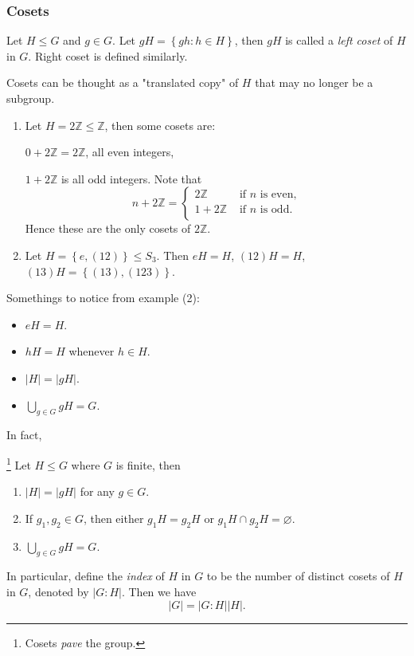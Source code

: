\documentclass[a4paper]{article}
\begin{document}
    \subsubsection{Cosets}
    \begin{definition}
        Let $H\le G$ and $g\in G$. Let $ gH=\left\{ gh:h\in H\right\} $, then $gH$ is called a \textit{left coset} of $H$ in $G$. Right coset is defined similarly.
    \end{definition}
    Cosets can be thought as a "translated copy" of $H$ that may no longer be a subgroup.
    \begin{example}
        \begin{enumerate}[(1)]
            \item Let $ H=2 \mathbb{Z} \le \mathbb{Z} $, then some cosets are: 

            $0+2\mathbb{Z}=2 \mathbb{Z}$, all even integers,

            $ 1+2 \mathbb{Z} $ is all odd integers. Note that 
            \[
                n+  2 \mathbb{Z} =\begin{cases}
                2\mathbb{Z} &\text{ if $n$ is even,}\\
                1+2\mathbb{Z} &\text{ if $n$ is odd.}\\
                \end{cases} 
            \]
            Hence these are the only cosets of $2 \mathbb{Z}$.
            \item Let $ H=\left\{ e,(12)\right\}\le S_3 $. Then $eH=H$, $ (12)H=H $, $ (13)H=\left\{ (13),(123)\right\} $.
        \end{enumerate}
    \end{example}
    Somethings to notice from example (2):
    \begin{itemize}
        \item $eH=H$.
        \item $hH=H$ whenever $h\in H$.
        \item $|H|=|gH|$.
        \item $\displaystyle \bigcup_{g\in G}gH=G$. 
    \end{itemize}
    In fact, 
    \begin{theorem}[Lagrange]\label{thm:Lagrange}\footnote{Cosets \textit{pave} the group.}
        Let $ H \le G $ where $G$ is finite, then 
        \begin{enumerate}
            \item $ |H|=|gH| $ for any $ g\in G $.
            \item If $ g_1,g_2\in G $, then either $ g_1H=g_2H $ or $ g_1H \cap g_2 H=\varnothing  $.
            \item $ \displaystyle \bigcup_{g\in G}gH=G $.
        \end{enumerate}
        In particular, define the \textit{index} of $H$ in $G$ to be the number of distinct cosets of $H$ in $G$, denoted by $ |G:H| $. Then we have 
        \[
            |G|=|G:H||H|
        .\]
    \end{theorem}
\end{document}
